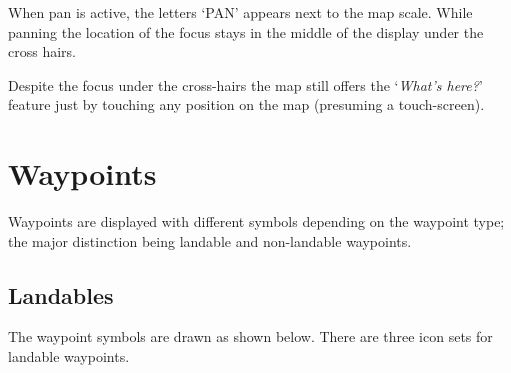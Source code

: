 When pan is active, the letters `PAN' appears next to the map scale.  While
panning the location of the focus stays in the middle of the display under the
cross hairs. 

Despite the focus under the cross-hairs the map
still offers the `\emph{What's here?}' feature just by touching any 
position on the map (presuming a touch-screen).


\section{Waypoints}\label{sec:waypoint-schemes}
Waypoints are displayed with different symbols depending on the
waypoint type; the major distinction being landable and non-landable
waypoints.

\subsection*{Landables}
The waypoint symbols are drawn as shown below. There are three icon sets for
landable waypoints. 

